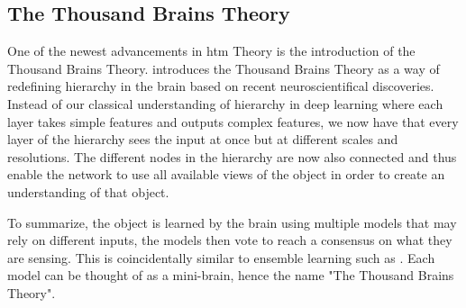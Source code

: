 \subsection{The Thousand Brains Theory}
One of the newest advancements in \gls*{htm} Theory is the introduction of the Thousand Brains Theory. \textcite{thousandbrains} introduces the Thousand Brains Theory as a way of redefining hierarchy in the brain based on recent neuroscientifical discoveries. Instead of our classical understanding of hierarchy in deep learning where each layer takes simple features and outputs complex features, we now have that every layer of the hierarchy sees the input at once but at different scales and resolutions. The different nodes in the hierarchy are now also connected and thus enable the network to use all available views of the object in order to create an understanding of that object. \par
To summarize, the object is learned by the brain using multiple models that may rely on different inputs, the models then vote to reach a consensus on what they are sensing. This is coincidentally similar to ensemble learning such as \textcite{divergentNets}. Each model can be thought of as a mini-brain, hence the name "The Thousand Brains Theory".

